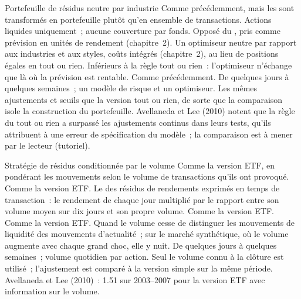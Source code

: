 \begin{strategyfile}{Portefeuille de résidus neutre par industrie}\label{strat:s1:residual-and-principal-component-stat-arb:industry}
 Comme précédemment, mais les  sont transformés en portefeuille plutôt qu'en ensemble de transactions.
 Actions liquides uniquement~; aucune couverture par fonds.
 Opposé du , pris comme prévision en unités de rendement (chapitre~2).
 Un optimiseur neutre par rapport aux industries et aux styles, coûts intégrés (chapitre~2), au lieu de positions égales en tout ou rien.
 Inférieurs à la règle tout ou rien~: l'optimiseur n'échange que là où la prévision est rentable.
 Comme précédemment.
 De quelques jours à quelques semaines~; un modèle de risque et un optimiseur.
 Les mêmes ajustements et seuils que la version tout ou rien, de sorte que la comparaison isole la construction du portefeuille.
 Avellaneda et Lee (2010) notent que la règle du tout ou rien a surpassé les ajustements continus dans leurs tests, qu'ils attribuent à une
erreur de spécification du modèle~; la comparaison est à mener par le lecteur (tutoriel).
\end{strategyfile}

\begin{strategyfile}{Stratégie de résidus conditionnée par le volume}\label{strat:s1:residual-and-principal-component-stat-arb:volume}
 Comme la version ETF, en pondérant les mouvements selon le volume de transactions qu'ils ont provoqué.
 Comme la version ETF.
 Le  des résidus de rendements exprimés en temps de transaction~: le rendement de chaque jour multiplié par le rapport entre son volume moyen sur dix jours et son propre volume.
 Comme la version ETF.
 Comme la version ETF.
 Quand le volume cesse de distinguer les mouvements de liquidité des mouvements d'actualité~; sur le marché synthétique, où le volume augmente avec chaque grand choc,
elle y nuit.
 De quelques jours à quelques semaines~; volume quotidien par action.
 Seul le volume connu à la clôture est utilisé~; l'ajustement est comparé à la version simple sur la même période.
 Avellaneda et Lee (2010)~: 1.51 sur 2003--2007 pour la version ETF avec information sur le volume.
\end{strategyfile}


